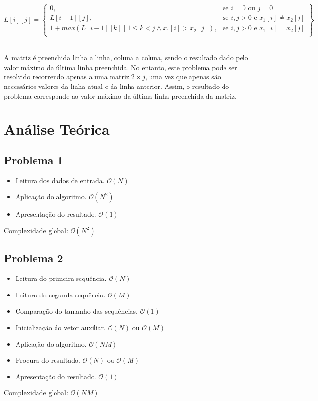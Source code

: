 \documentclass[12pt, letterpaper]{article}
\begin{document}
\begin{center}
	\[
	L[i][j] = \left\{\begin{array}{lr}
		0, & \text{se } i = 0 \text{ ou } j = 0\\
		L[i-1][j], & \text{se } i,j > 0 \text{ e } x_1[i] \neq x_2[j]\\
		1 +	max(L[i-1][k] \mid 1 \leq k < j \land x_1[i] > x_2[j]), & \text{se } i,j > 0 \text{ e } x_1[i] = x_2[j]\\
        \end{array}\right\}
	\]\\[\baselineskip]
\end{center}

A matriz é preenchida linha a linha, coluna a coluna, sendo o resultado dado
pelo valor máximo da última linha preenchida.
No entanto, este problema pode ser resolvido recorrendo apenas a uma matriz $2
\times j$, uma vez que apenas são necessários valores da linha atual e da linha
anterior. Assim, o resultado do problema corresponde ao valor máximo da última
linha preenchida da matriz.


\pagebreak
\section{Análise Teórica}

\subsection{Problema 1}
\begin{itemize}
	\item Leitura dos dados de entrada. $\mathcal{O}(N)$
	\item Aplicação do algoritmo. $\mathcal{O}(N^2)$
	\item Apresentação do resultado. $\mathcal{O}(1)$
\end{itemize}
Complexidade global: $\mathcal{O}(N^2)$

\subsection{Problema 2}
\begin{itemize}
	\item Leitura do primeira sequência. $\mathcal{O}(N)$
	\item Leitura do segunda sequência. $\mathcal{O}(M)$
	\item Comparação do tamanho das sequências. $\mathcal{O}(1)$
	\item Inicialização do vetor auxiliar. $\mathcal{O}(N)$ ou $\mathcal{O}(M)$
	\item Aplicação do algoritmo. $\mathcal{O}(NM)$
	\item Procura do resultado. $\mathcal{O}(N)$ ou $\mathcal{O}(M)$
	\item Apresentação do resultado. $\mathcal{O}(1)$
\end{itemize}
Complexidade global: $\mathcal{O}(NM)$
\end{document}
